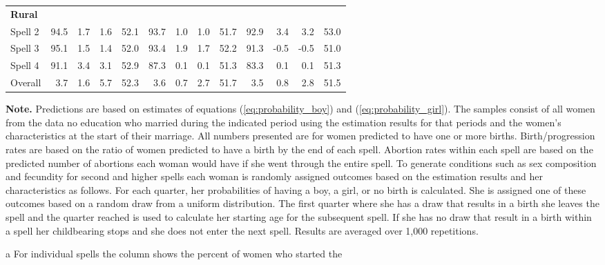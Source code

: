 \documentclass[12pt,letterpaper]{article}
\begin{document}
\begin{table}[htbp]
\begin{center}
\begin{scriptsize}
\begin{threeparttable}
\begin{tabular} {@{} l D{.}{.}{2.1} D{.}{.}{2.1} D{.}{.}{2.1} D{.}{.}{2.1}  D{.}{.}{2.1} D{.}{.}{2.1} D{.}{.}{2.1} D{.}{.}{2.1} D{.}{.}{2.1} D{.}{.}{2.1} D{.}{.}{2.1} D{.}{.}{2.1}  @{}}
\addlinespace 
\bf Rural        &  \\                                                                                  
Spell 2          &       94.5   &  1.7    &  1.6    &  52.1   &       93.7   &  1.0    &  1.0    &  51.7   &       92.9   &  3.4    &  3.2    &  53.0   \\
Spell 3          &       95.1   &  1.5    &  1.4    &  52.0   &       93.4   &  1.9    &  1.7    &  52.2   &       91.3   &  -0.5   &  -0.5   &  51.0   \\
Spell 4          &       91.1   &  3.4    &  3.1    &  52.9   &       87.3   &  0.1    &  0.1    &  51.3   &       83.3   &  0.1    &  0.1    &  51.3   \\
Overall &       3.7    &  1.6    &  5.7    &  52.3   &       3.6    &  0.7    &  2.7    &  51.7   &       3.5    &  0.8    &  2.8    &  51.5   \\
\bottomrule
\end{tabular}                        
\begin{tablenotes} \tiny
\item \hspace*{-0.5em} \textbf{Note.} Predictions are based on estimates of equations 
(\ref{eq:probability_boy}) and (\ref{eq:probability_girl}).
The samples consist of all women from the data no education who
married during the indicated period using the estimation results for that periods 
and the women's characteristics at the start of their marriage. 
All numbers presented are for women predicted to have one or more births.
Birth/progression rates are based on the ratio of women predicted to have a birth 
by the end of each spell.
Abortion rates within each spell are based on the predicted number of abortions each
woman would have if she went through the entire spell.
To generate conditions such as sex composition and fecundity for second and higher spells 
each woman is randomly assigned outcomes based on the estimation results and
her characteristics as follows.
For each quarter, her probabilities of having a boy, a girl, or no birth is calculated.
She is assigned one of these outcomes based on a random draw from a uniform distribution.
The first quarter where she has a draw that results in a birth she leaves the spell
and the quarter reached is used to calculate her starting age for the subsequent spell.
If she has no draw that result in a birth within a spell her childbearing stops and
she does not enter the next spell.
Results are averaged over 1,000 repetitions.
\item[a] For individual spells the column shows the percent of women who started the

\end{tablenotes}
\end{threeparttable}
\end{scriptsize}
\end{center}
\end{table}
\end{document}
